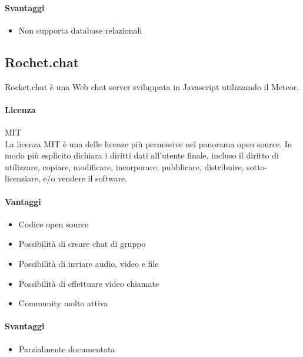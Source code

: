 \paragraph{Svantaggi} 
\begin{itemize}
	\item Non supporta database relazionali
	
\end{itemize}

\subsection{Rochet.chat}

Rocket.chat è una Web chat server sviluppata in Javascript utilizzando il  Meteor.

\paragraph{Licenza} MIT \\
La licenza MIT è una delle licenze più permissive nel panorama open
source. In modo più esplicito dichiara i diritti dati all'utente
finale, incluso il diritto di utilizzare, copiare, modificare,
incorporare, pubblicare, distribuire, sotto-licenziare, e/o vendere il
software. \\

\paragraph{Vantaggi}
\begin{itemize}

	\item Codice open source
	\item Possibilità di creare chat di gruppo
	\item Possibilità di inviare audio, video e file
	\item Possibilità di effettuare video chiamate
	\item Community molto attiva

	
\end{itemize}

\paragraph{Svantaggi} 
\begin{itemize}
	\item Parzialmente documentata
\end{itemize}

